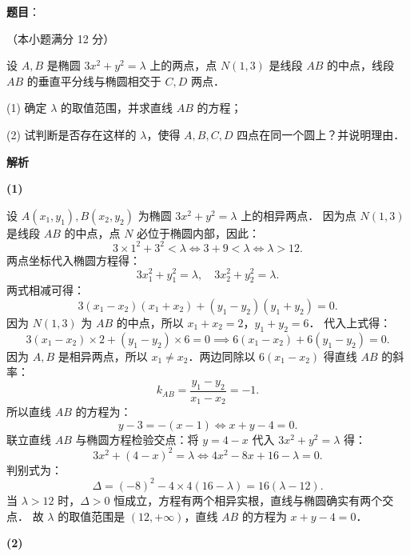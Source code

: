 \begin{answer}

\textbf{题目}：

（本小题满分 12 分）

设 $A, B$ 是椭圆 $3x^2 + y^2 = \lambda$ 上的两点，点 $N(1, 3)$ 是线段 $AB$ 的中点，线段 $AB$ 的垂直平分线与椭圆相交于 $C, D$ 两点．

(1) 确定 $\lambda$ 的取值范围，并求直线 $AB$ 的方程；

(2) 试判断是否存在这样的 $\lambda$，使得 $A, B, C, D$ 四点在同一个圆上？并说明理由．

\textbf{解析}

\textbf{(1)}

设 $A(x_1, y_1), B(x_2, y_2)$ 为椭圆 $3x^2 + y^2 = \lambda$ 上的相异两点．
因为点 $N(1, 3)$ 是线段 $AB$ 的中点，点 $N$ 必位于椭圆内部，因此：
\nopagebreak[4]
\[
3 \times 1^2 + 3^2 < \lambda \iff 3 + 9 < \lambda \iff \lambda > 12.
\]
两点坐标代入椭圆方程得：
\nopagebreak[4]
\[
3x_1^2 + y_1^2 = \lambda, \quad 3x_2^2 + y_2^2 = \lambda.
\]
两式相减可得：
\nopagebreak[4]
\[
3(x_1 - x_2)(x_1 + x_2) + (y_1 - y_2)(y_1 + y_2) = 0.
\]
因为 $N(1, 3)$ 为 $AB$ 的中点，所以 $x_1 + x_2 = 2$，$y_1 + y_2 = 6$．
代入上式得：
\nopagebreak[4]
\[
3(x_1 - x_2) \times 2 + (y_1 - y_2) \times 6 = 0 \implies 6(x_1 - x_2) + 6(y_1 - y_2) = 0.
\]
因为 $A, B$ 是相异两点，所以 $x_1 \neq x_2$．两边同除以 $6(x_1 - x_2)$ 得直线 $AB$ 的斜率：
\nopagebreak[4]
\[
k_{AB} = \frac{y_1 - y_2}{x_1 - x_2} = -1.
\]
所以直线 $AB$ 的方程为：
\nopagebreak[4]
\[
y - 3 = -(x - 1) \iff x + y - 4 = 0.
\]
联立直线 $AB$ 与椭圆方程检验交点：将 $y = 4 - x$ 代入 $3x^2 + y^2 = \lambda$ 得：
\nopagebreak[4]
\[
3x^2 + (4 - x)^2 = \lambda \iff 4x^2 - 8x + 16 - \lambda = 0.
\]
判别式为：
\nopagebreak[4]
\[
\Delta = (-8)^2 - 4 \times 4(16 - \lambda) = 16(\lambda - 12).
\]
当 $\lambda > 12$ 时，$\Delta > 0$ 恒成立，方程有两个相异实根，直线与椭圆确实有两个交点．
故 $\lambda$ 的取值范围是 $(12, +\infty)$，直线 $AB$ 的方程为 $x + y - 4 = 0$．

\textbf{(2)}


\end{answer}
